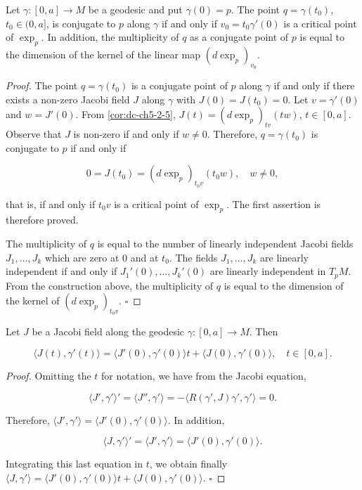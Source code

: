 \begin{proposition}[Proposition 3.5]
  \label{prop:dc-ch5-3-5}
  Let $\gamma:[0,a]\to M$ be a geodesic and put $\gamma(0)=p$. The point
  $q=\gamma(t_0)$, $t_0\in(0,a]$, is conjugate to $p$ along $\gamma$ if and only if
  $v_0=t_0\gamma'(0)$ is a critical point of $\exp_p$. In addition, the multiplicity
  of $q$ as a conjugate point of $p$ is equal to the dimension of the kernel of the
  linear map $(d\exp_p)_{v_0}$.
\end{proposition}
\begin{proof}
  The point $q=\gamma(t_0)$ is a conjugate point of $p$ along $\gamma$ if
  and only if there exists a non-zero Jacobi field $J$ along $\gamma$ with
  $J(0)=J(t_0)=0$. Let $v=\gamma'(0)$ and $w=J'(0)$. From \cref{cor:dc-ch5-2-5},
  $J(t)=(d\exp_p)_{tv}(tw)$, $t\in[0,a]$. Observe that $J$ is non-zero if and only
  if $w\neq 0$. Therefore, $q=\gamma(t_0)$ is conjugate to $p$ if and only if
  
  $$
  0=J(t_0)=(d\exp_p)_{t_0 v}(t_0 w),\quad w\neq 0,
  $$
  
  that is, if and only if $t_0 v$ is a critical point of $\exp_p$. The first
  assertion is therefore proved.
  
  The multiplicity of $q$ is equal to the number of linearly independent Jacobi
  fields $J_1,\dots,J_k$ which are zero at $0$ and at $t_0$. The fields
  $J_1,\dots,J_k$ are linearly independent if and only if
  $J_1'(0),\dots,J_k'(0)$ are linearly independent in $T_p M$. From the
  construction above, the multiplicity of $q$ is equal to the dimension of the
  kernel of $(d\exp_p)_{t_0 v}$. $\square$
\end{proof}

\begin{proposition}[Proposition 3.6]
  \label{prop:dc-ch5-3-6}
  Let $J$ be a Jacobi field along the geodesic $\gamma:[0,a]\to M$. Then
  
  $$
  \langle J(t),\gamma'(t)\rangle=\langle J'(0),\gamma'(0)\rangle t+\langle J(0),\gamma'(0)\rangle,\quad t\in[0,a].
  $$
\end{proposition}
\begin{proof}
  Omitting the $t$ for notation, we have from the Jacobi equation,
  
  $$
  \langle J',\gamma'\rangle'=\langle J'',\gamma'\rangle=-\langle R(\gamma',J)\gamma',\gamma'\rangle=0.
  $$
  
  Therefore, $\langle J',\gamma'\rangle=\langle J'(0),\gamma'(0)\rangle$. In
  addition,
  
  $$
  \langle J,\gamma'\rangle'=\langle J',\gamma'\rangle=\langle J'(0),\gamma'(0)\rangle.
  $$
  
  Integrating this last equation in $t$, we obtain finally
  $\langle J,\gamma'\rangle=\langle J'(0),\gamma'(0)\rangle t+\langle J(0),\gamma'(0)\rangle$.
  $\square$
\end{proof}

